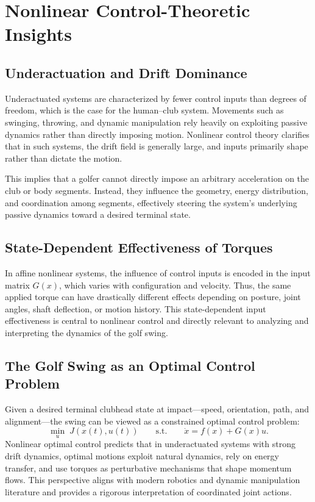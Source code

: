 \documentclass[12pt]{article}
\begin{document}
\section{Nonlinear Control-Theoretic Insights}

\subsection{Underactuation and Drift Dominance}

Underactuated systems are characterized by fewer control inputs than degrees of freedom, which is the case for the human--club system. Movements such as swinging, throwing, and dynamic manipulation rely heavily on exploiting passive dynamics rather than directly imposing motion. Nonlinear control theory clarifies that in such systems, the drift field is generally large, and inputs primarily shape rather than dictate the motion.

This implies that a golfer cannot directly impose an arbitrary acceleration on the club or body segments. Instead, they influence the geometry, energy distribution, and coordination among segments, effectively steering the system's underlying passive dynamics toward a desired terminal state.

\subsection{State-Dependent Effectiveness of Torques}

In affine nonlinear systems, the influence of control inputs is encoded in the input matrix $G(x)$, which varies with configuration and velocity. Thus, the same applied torque can have drastically different effects depending on posture, joint angles, shaft deflection, or motion history. This state-dependent input effectiveness is central to nonlinear control and directly relevant to analyzing and interpreting the dynamics of the golf swing.

\subsection{The Golf Swing as an Optimal Control Problem}

Given a desired terminal clubhead state at impact---speed, orientation, path, and alignment---the swing can be viewed as a constrained optimal control problem:
\begin{equation}
\min_u \; J(x(t),u(t)) \qquad
\text{s.t.} \qquad \dot{x} = f(x) + G(x)u.
\end{equation}
Nonlinear optimal control predicts that in underactuated systems with strong drift dynamics, optimal motions exploit natural dynamics, rely on energy transfer, and use torques as perturbative mechanisms that shape momentum flows. This perspective aligns with modern robotics and dynamic manipulation literature and provides a rigorous interpretation of coordinated joint actions.
\end{document}
